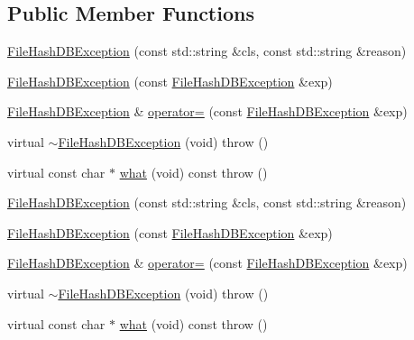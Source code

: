 \subsection*{Public Member Functions}
\begin{DoxyCompactItemize}
\item 
\mbox{\hyperlink{classFILEDB_1_1FileHashDBException_ae549056e12f10f0bb24e0875a70ec57b}{File\+Hash\+D\+B\+Exception}} (const std\+::string \&cls, const std\+::string \&reason)
\item 
\mbox{\hyperlink{classFILEDB_1_1FileHashDBException_ad018a7bda0cfd93d2efac5c16c10886e}{File\+Hash\+D\+B\+Exception}} (const \mbox{\hyperlink{classFILEDB_1_1FileHashDBException}{File\+Hash\+D\+B\+Exception}} \&exp)
\item 
\mbox{\hyperlink{classFILEDB_1_1FileHashDBException}{File\+Hash\+D\+B\+Exception}} \& \mbox{\hyperlink{classFILEDB_1_1FileHashDBException_a82f111a87cc81fef84c32f76ebbd15d7}{operator=}} (const \mbox{\hyperlink{classFILEDB_1_1FileHashDBException}{File\+Hash\+D\+B\+Exception}} \&exp)
\item 
virtual \mbox{\hyperlink{classFILEDB_1_1FileHashDBException_af163ad5163826f561cd5f997efff6287}{$\sim$\+File\+Hash\+D\+B\+Exception}} (void)  throw ()
\item 
virtual const char $\ast$ \mbox{\hyperlink{classFILEDB_1_1FileHashDBException_aaacefcbfdcc4a6c86affdaf5cca924e9}{what}} (void) const  throw ()
\item 
\mbox{\hyperlink{classFILEDB_1_1FileHashDBException_ae549056e12f10f0bb24e0875a70ec57b}{File\+Hash\+D\+B\+Exception}} (const std\+::string \&cls, const std\+::string \&reason)
\item 
\mbox{\hyperlink{classFILEDB_1_1FileHashDBException_ad018a7bda0cfd93d2efac5c16c10886e}{File\+Hash\+D\+B\+Exception}} (const \mbox{\hyperlink{classFILEDB_1_1FileHashDBException}{File\+Hash\+D\+B\+Exception}} \&exp)
\item 
\mbox{\hyperlink{classFILEDB_1_1FileHashDBException}{File\+Hash\+D\+B\+Exception}} \& \mbox{\hyperlink{classFILEDB_1_1FileHashDBException_ac7678441c40ae0bf44d1156dbabd596a}{operator=}} (const \mbox{\hyperlink{classFILEDB_1_1FileHashDBException}{File\+Hash\+D\+B\+Exception}} \&exp)
\item 
virtual \mbox{\hyperlink{classFILEDB_1_1FileHashDBException_aacf132dca5ed0d1b8dc3e4694c77c190}{$\sim$\+File\+Hash\+D\+B\+Exception}} (void)  throw ()
\item 
virtual const char $\ast$ \mbox{\hyperlink{classFILEDB_1_1FileHashDBException_aa8588fe36ad351eb1c1f17db8b48d349}{what}} (void) const  throw ()

\end{DoxyCompactItemize}
